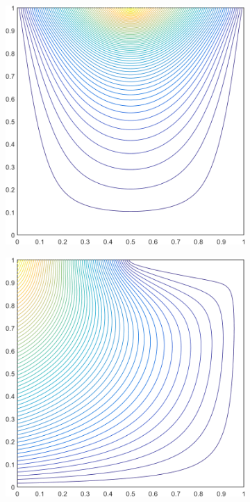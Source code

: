 \begin{figure}
\label{fig::2D_MAXENT1_deg_square_basis_functions}
\centering
	\begin{subfigure}[b]{0.39\textwidth}
		\centering
		\includegraphics[width=\textwidth]{figures/sec_BF/deg_square_MAXENT1_contour_b4.png}
		\caption{}
	\end{subfigure}
	\vfill
	\begin{subfigure}[b]{0.39\textwidth}
		\centering
		\includegraphics[width=\textwidth]{figures/sec_BF/deg_square_MAXENT1_contour_b5.png}

\end{subfigure}
\end{figure}
